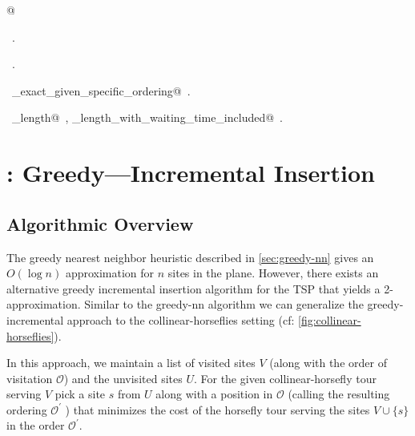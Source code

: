 \documentclass[11.5pt]{report}
\begin{document}
\begin{flushleft}
\begin{list}{}{}
\mbox{}\verb@   @\\
\mbox{}\verb@@{\NWsep}
\end{list}
\vspace{-1.5ex}
\footnotesize
\begin{list}{}{\setlength{\itemsep}{-\parsep}\setlength{\itemindent}{-\leftmargin}}
\item \NWtxtMacroDefBy\ .
\item \NWtxtMacroRefIn\ .
\item \NWtxtIdentsDefed\nobreak\  \verb@algo_exact_given_specific_ordering@\nobreak\ .\item \NWtxtIdentsUsed\nobreak\  \verb@tour_length@\nobreak\ , \verb@tour_length_with_waiting_time_included@\nobreak\ .
\item{}
\end{list}
\vspace{4ex}
\end{flushleft}
\section{: Greedy---Incremental Insertion}
\subsection*{Algorithmic Overview}
\newchunk The greedy nearest neighbor heuristic described in \autoref{sec:greedy-nn} gives an $O(\log n)$ 
          approximation for $n$ sites in the plane. However, there exists an alternative greedy incremental 
          insertion algorithm for the TSP that yields a 2-approximation. Similar to the greedy-nn algorithm 
          we can generalize the greedy-incremental approach to the collinear-horseflies setting 
          (cf: \autoref{fig:collinear-horseflies}). 

\newchunk In this approach, we maintain a list of visited sites $V$ (along with the order of visitation 
          $\mathcal{O}$) and the unvisited sites $U$. For the given collinear-horsefly tour serving $V$ 
          pick a site $s$ from $U$ along with a position in $\mathcal{O}$ (calling the resulting ordering  
          $\mathcal{O^{'}}$  ) that minimizes the cost of the horsefly tour serving the sites $V \cup \{s\}$ 
          in the order $\mathcal{O^{'}}$. 
\end{document}

